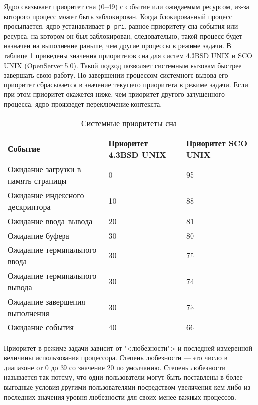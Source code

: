 \documentclass[a4paper,oneside,14pt]{extreport}
\newcommand{\code}[1]{\texttt{#1}}
\begin{document}
Ядро связывает приоритет сна (0--49) с событие или ожидаемым ресурсом, из-за которого процесс может быть заблокирован. Когда блокированный процесс просыпается, ядро устанавливает \code{p{\_}pri}, равное приоритету сна события или ресурса, на котором он был заблокирован, следовательно, такой процесс будет назначен на выполнение раньше, чем другие процессы в режиме задачи. В таблице \ref{tbl:sleeppriority} приведены значения приоритетов сна для систем 4.3BSD UNIX и SCO UNIX (OpenServer 5.0). Такой подход позволяет системным вызовам быстрее завершать свою работу. По завершении процессом системного вызова его приоритет сбрасывается в значение текущего приоритета в режиме задачи. Если при этом приоритет окажется ниже, чем приоритет другого запущенного процесса, ядро произведет переключение контекста.

\begin{table}
\begin{center}
\begin{tabular}{|l|p{65pt}|p{65pt}|} 
	\hline
	{Событие} & {Приоритет 4.3BSD UNIX} & {Приоритет SCO UNIX}\\
	\hline
	{Ожидание загрузки в память страницы} & 0 & 95\\
	\hline
	{Ожидание индексного дескриптора} & 10 & 88\\
	\hline
	{Ожидание ввода--вывода} & 20 & 81 \\
	\hline
	{Ожидание буфера} & 30 & 80\\
	\hline
	{Ожидание терминального ввода} & 30 & 75\\
	\hline
	{Ожидание терминального вывода} & 30 & 74\\
	\hline
	{Ожидание завершения выполнения} & 30 & 73\\
	\hline
	{Ожидание события} & 40 & 66\\
	\hline
\end{tabular}
\end{center}
\caption{Системные приоритеты сна}
\label{tbl:sleeppriority}
\end{table}

Приоритет в режиме задачи зависит от "<любезности"> и последней измеренной величины использования процессора. Степень любезности --- это число в диапазоне от 0 до 39 со значение 20 по умолчанию. Степень любезности называется так потому, что одни пользователи могут быть поставлены в более выгодные условия другими пользователями посредством увеличения кем-либо из последних значения уровня любезности для своих менее важных процессов.
\end{document}
